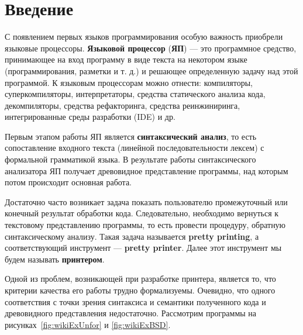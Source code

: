 \section*{Введение}


С появлением первых языков программирования особую важность приобрели языковые процессоры. \textbf{Языковой процессор} (\textbf{ЯП}) --- это программное средство, принимающее на вход программу в виде текста на некотором языке (программирования, разметки и т. д.) и решающее определенную задачу над этой программой. К языковым процессорам можно отнести: компиляторы, суперкомпиляторы, интерпретаторы, средства статического анализа кода, декомпиляторы, средства рефакторинга, средства реинжиниринга, интегрированные среды разработки (IDE) и др.

Первым этапом работы ЯП является \textbf{синтаксический анализ}, то есть сопоставление входного текста (линейной последовательности лексем) с формальной грамматикой языка. В результате работы синтаксического анализатора ЯП получает древовидное представление программы, над которым потом происходит основная работа.

Достаточно часто возникает задача показать пользователю промежуточный или конечный результат обработки кода.
Следовательно, необходимо вернуться к текстовому представлению программы, то есть провести процедуру, обратную синтаксическому анализу. Такая задача называется \textbf{pretty printing}, а соответствующий инструмент --- \textbf{pretty printer}. Далее этот инструмент мы будем называть \textbf{принтером}.

Одной из проблем, возникающей при разработке принтера, является то, что критерии качества его работы трудно формализуемы.
Очевидно, что одного соответствия с точки зрения синтаксиса и семантики полученного кода и древовидного представления недостаточно. Рассмотрим программы на рисунках~\ref{fig:wikiExUnfor} и \ref{fig:wikiExBSD}.

